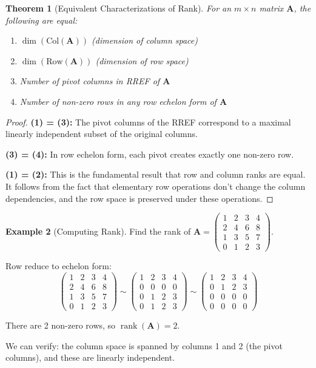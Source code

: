 \documentclass[12pt]{article}
\numberwithin{equation}{section}
\newcommand{\mat}[1]{\mathbf{#1}}        %
\newcommand{\rank}{\operatorname{rank}}
\theoremstyle{plain}
\newtheorem{theorem}{Theorem}[section]
\theoremstyle{definition}
\newtheorem{example}[theorem]{Example}
\theoremstyle{remark}
\begin{document}
\begin{theorem}[Equivalent Characterizations of Rank]
For an $m \times n$ matrix $\mat{A}$, the following are equal:
\begin{enumerate}
\item $\dim(\text{Col}(\mat{A}))$ (dimension of column space)
\item $\dim(\text{Row}(\mat{A}))$ (dimension of row space)
\item Number of pivot columns in RREF of $\mat{A}$
\item Number of non-zero rows in any row echelon form of $\mat{A}$
\end{enumerate}
\end{theorem}

\begin{proof}
\textbf{(1) = (3):} The pivot columns of the RREF correspond to a maximal linearly independent subset of the original columns.

\textbf{(3) = (4):} In row echelon form, each pivot creates exactly one non-zero row.

\textbf{(1) = (2):} This is the fundamental result that row and column ranks are equal. It follows from the fact that elementary row operations don't change the column dependencies, and the row space is preserved under these operations.
\end{proof}

\begin{example}[Computing Rank]
Find the rank of $\mat{A} = \begin{pmatrix} 1 & 2 & 3 & 4 \\ 2 & 4 & 6 & 8 \\ 1 & 3 & 5 & 7 \\ 0 & 1 & 2 & 3 \end{pmatrix}$.

Row reduce to echelon form:
$$\begin{pmatrix} 1 & 2 & 3 & 4 \\ 2 & 4 & 6 & 8 \\ 1 & 3 & 5 & 7 \\ 0 & 1 & 2 & 3 \end{pmatrix} \sim \begin{pmatrix} 1 & 2 & 3 & 4 \\ 0 & 0 & 0 & 0 \\ 0 & 1 & 2 & 3 \\ 0 & 1 & 2 & 3 \end{pmatrix} \sim \begin{pmatrix} 1 & 2 & 3 & 4 \\ 0 & 1 & 2 & 3 \\ 0 & 0 & 0 & 0 \\ 0 & 0 & 0 & 0 \end{pmatrix}$$

There are 2 non-zero rows, so $\rank(\mat{A}) = 2$.

We can verify: the column space is spanned by columns 1 and 2 (the pivot columns), and these are linearly independent.
\end{example}
\end{document}

